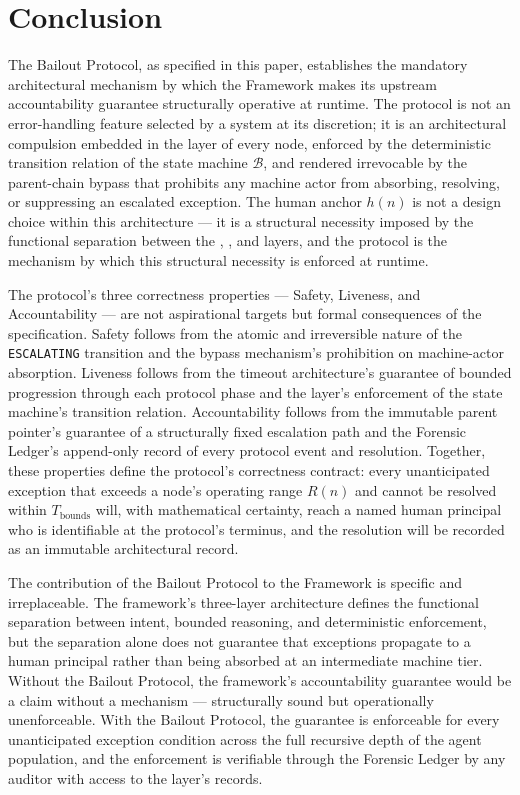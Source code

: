 \section{Conclusion}\label{sec:conclusion}

The Bailout Protocol, as specified in this paper, establishes the mandatory architectural mechanism by which the \bxthree{} Framework makes its upstream accountability guarantee structurally operative at runtime. The protocol is not an error-handling feature selected by a system at its discretion; it is an architectural compulsion embedded in the \fact{} layer of every \bxthree{} node, enforced by the deterministic transition relation of the state machine $\mathcal{B}$, and rendered irrevocable by the parent-chain bypass that prohibits any machine actor from absorbing, resolving, or suppressing an escalated exception. The human anchor $h(n)$ is not a design choice within this architecture --- it is a structural necessity imposed by the functional separation between the \purpose{}, \bounds{}, and \fact{} layers, and the protocol is the mechanism by which this structural necessity is enforced at runtime.

The protocol's three correctness properties --- Safety, Liveness, and Accountability --- are not aspirational targets but formal consequences of the specification. Safety follows from the atomic and irreversible nature of the \texttt{ESCALATING} transition and the bypass mechanism's prohibition on machine-actor absorption. Liveness follows from the timeout architecture's guarantee of bounded progression through each protocol phase and the \fact{} layer's enforcement of the state machine's transition relation. Accountability follows from the immutable parent pointer's guarantee of a structurally fixed escalation path and the Forensic Ledger's append-only record of every protocol event and resolution. Together, these properties define the protocol's correctness contract: every unanticipated exception that exceeds a node's operating range $R(n)$ and cannot be resolved within $T_{\text{bounds}}$ will, with mathematical certainty, reach a named human principal who is identifiable at the protocol's terminus, and the resolution will be recorded as an immutable architectural record.

The contribution of the Bailout Protocol to the \bxthree{} Framework is specific and irreplaceable. The framework's three-layer architecture defines the functional separation between intent, bounded reasoning, and deterministic enforcement, but the separation alone does not guarantee that exceptions propagate to a human principal rather than being absorbed at an intermediate machine tier. Without the Bailout Protocol, the framework's accountability guarantee would be a claim without a mechanism --- structurally sound but operationally unenforceable. With the Bailout Protocol, the guarantee is enforceable for every unanticipated exception condition across the full recursive depth of the agent population, and the enforcement is verifiable through the Forensic Ledger by any auditor with access to the \fact{} layer's records.

